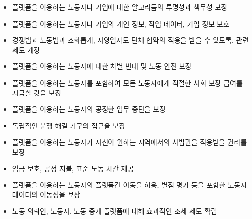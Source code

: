 \begin{itemize}
\begin{itemize}
\begin{itemize}
		\item 플랫폼을 이용하는 노동자나 기업에 대한 알고리듬의 투명성과 책무성 보장
		\item 플랫폼을 이용하는 노동자나 기업의 개인 정보, 작업 데이터, 기업 정보 보호
		\item 경쟁법과 노동법과 조화롭게, 자영업자도 단체 협약의 적용을 받을 수 있도록, 관련 제도 개정
		\item 플랫폼을 이용하는 노동자에 대한 차별 반대 및 노동 안전 보장
		\item 플랫폼을 이용하는 노동자를 포함하여 모든 노동자에게 적절한 사회 보장 급여를 지급할 것을 보장
		\item 플랫폼을 이용하는 노동자의 공정한 업무 중단을 보장
		\item 독립적인 분쟁 해결 기구의 접근을 보장
		\item 플랫폼을 이용하는 노동자가 자신이 원하는 지역에서의 사법권을 적용받을 권리를 보장
		\item 임금 보호, 공정 지불, 표준 노동 시간 제공
		\item 플랫폼을 이용하는 노동자의 플랫폼간 이동을 허용, 별점 평가 등을 포함한 노동자 데이터의 이동성을 보장
		\item 노동 의뢰인, 노동자, 노동 중개 플랫폼에 대해 효과적인 조세 제도 확립
		\end{itemize}			
	\end{itemize}
\end{itemize}	

